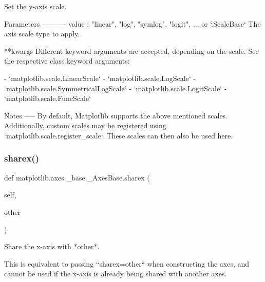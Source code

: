 \begin{DoxyVerb}Set the y-axis scale.

Parameters
----------
value : {"linear", "log", "symlog", "logit", ...} or `.ScaleBase`
    The axis scale type to apply.

**kwargs
    Different keyword arguments are accepted, depending on the scale.
    See the respective class keyword arguments:

    - `matplotlib.scale.LinearScale`
    - `matplotlib.scale.LogScale`
    - `matplotlib.scale.SymmetricalLogScale`
    - `matplotlib.scale.LogitScale`
    - `matplotlib.scale.FuncScale`

Notes
-----
By default, Matplotlib supports the above mentioned scales.
Additionally, custom scales may be registered using
`matplotlib.scale.register_scale`. These scales can then also
be used here.
\end{DoxyVerb}
 \mbox{\label{classmatplotlib_1_1axes_1_1__base_1_1__AxesBase_ad21c01ca3c449dac1134cf4babc6997d}} 
\subsubsection{\texorpdfstring{sharex()}{sharex()}}
{\footnotesize\ttfamily def matplotlib.\+axes.\+\_\+base.\+\_\+\+Axes\+Base.\+sharex (\begin{DoxyParamCaption}\item[{}]{self,  }\item[{}]{other }\end{DoxyParamCaption})}

\begin{DoxyVerb}Share the x-axis with *other*.

This is equivalent to passing ``sharex=other`` when constructing the
axes, and cannot be used if the x-axis is already being shared with
another axes.
\end{DoxyVerb}
 \mbox{\label{classmatplotlib_1_1axes_1_1__base_1_1__AxesBase_adcd1add9e07535a57a121091b4b55f37}} 
